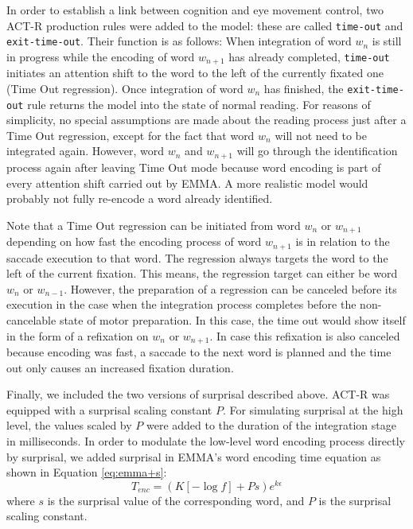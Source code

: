 In order to establish a link between cognition and eye movement control, two ACT-R production rules were added to the model: these are called \texttt{time-out} and  \texttt{exit-time-out}.  Their function is as follows: When integration of word $w_n$ is still in progress while the encoding of word $w_{n+1}$ has already completed, \texttt{time-out} initiates an attention shift to the word to the left of the currently fixated one  (Time Out regression).  Once integration of word $w_n$ has finished, the \texttt{exit-time-out} rule returns the model into the state of normal reading.
For reasons of simplicity, no special assumptions are made about the reading process just after a Time Out regression, except for the fact that word $w_n$ will not need to be integrated again.  However, word $w_{n}$ and $w_{n+1}$ will go through the identification process again after leaving Time Out mode because word encoding is part of every attention shift carried out by EMMA.  A more realistic model would probably not fully re-encode a word already identified.  

Note that a Time Out regression can be initiated from word $w_{n}$ or $w_{n+1}$ depending on how fast the encoding process of word $w_{n+1}$ is in relation to the saccade execution to that word.  The regression always targets the word to the left of the current fixation.  This means, the regression target can either be word $w_{n}$ or  $w_{n-1}$.  However, the preparation of a regression can be canceled before its execution in the case when the integration process completes before the non-cancelable state of motor preparation.  In this case, the time out would show itself in the form of a refixation on $w_{n}$ or $w_{n+1}$.  In case this refixation is also canceled because encoding was fast, a saccade to the next word is planned and the time out only causes an increased fixation duration.

Finally, we included the two versions of surprisal described above.  ACT-R was equipped with a surprisal scaling constant $P$. 
For simulating surprisal at the high level, the values scaled by $P$ were added to the duration of the integration stage in milliseconds.  In order to modulate the low-level word encoding process directly by surprisal, we added surprisal in EMMA's word encoding time equation as shown in Equation \ref{eq:emma+s}:
\begin{equation}
T_{enc} = (K [-\log{f}] + Ps)e^{k\epsilon}
\label{eq:emma+s}
\end{equation}
where $s$ is the surprisal value of the corresponding word, and $P$ is the surprisal scaling constant.

